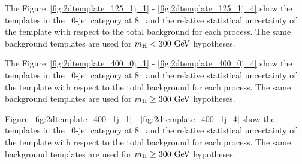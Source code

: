 The Figure~\ref{fig:2dtemplate_125_1j_1} - \ref{fig:2dtemplate_125_1j_4} show the templates 
in the \DF\ 0-jet category at 8 \TeV\ and the relative statistical uncertainty of the template 
with respect to the total background for each process. 
The same background templates are used for $m_{\mathrm{H}}<300~\mathrm{Ge\kern -0.1em V}$ hypotheses. 

The Figure~\ref{fig:2dtemplate_400_0j_1} - \ref{fig:2dtemplate_400_0j_4} show the templates 
in the \DF\ 0-jet category at 8 \TeV\ and the relative statistical uncertainty of the template 
with respect to the total background for each process. 
The same background templates are used for $m_{\mathrm{H}}\geq300~\mathrm{Ge\kern -0.1em V}$ hypotheses. 

Figure~\ref{fig:2dtemplate_400_1j_1} - \ref{fig:2dtemplate_400_1j_4} show the templates 
in the \DF\ 0-jet category at 8 \TeV\ and the relative statistical uncertainty of the template 
with respect to the total background for each process. 
The same background templates are used for $m_{\mathrm{H}}\geq300~\mathrm{Ge\kern -0.1em V}$ hypotheses. 

